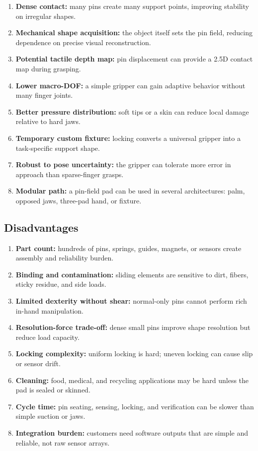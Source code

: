 \documentclass[11pt]{article}
\begin{document}
\begin{enumerate}[leftmargin=*]
  \item \textbf{Dense contact:} many pins create many support points, improving stability on irregular shapes.
  \item \textbf{Mechanical shape acquisition:} the object itself sets the pin field, reducing dependence on precise visual reconstruction.
  \item \textbf{Potential tactile depth map:} pin displacement can provide a 2.5D contact map during grasping.
  \item \textbf{Lower macro-DOF:} a simple gripper can gain adaptive behavior without many finger joints.
  \item \textbf{Better pressure distribution:} soft tips or a skin can reduce local damage relative to hard jaws.
  \item \textbf{Temporary custom fixture:} locking converts a universal gripper into a task-specific support shape.
  \item \textbf{Robust to pose uncertainty:} the gripper can tolerate more error in approach than sparse-finger grasps.
  \item \textbf{Modular path:} a pin-field pad can be used in several architectures: palm, opposed jaws, three-pad hand, or fixture.
\end{enumerate}

\subsection{Disadvantages}

\begin{enumerate}[leftmargin=*]
  \item \textbf{Part count:} hundreds of pins, springs, guides, magnets, or sensors create assembly and reliability burden.
  \item \textbf{Binding and contamination:} sliding elements are sensitive to dirt, fibers, sticky residue, and side loads.
  \item \textbf{Limited dexterity without shear:} normal-only pins cannot perform rich in-hand manipulation.
  \item \textbf{Resolution-force trade-off:} dense small pins improve shape resolution but reduce load capacity.
  \item \textbf{Locking complexity:} uniform locking is hard; uneven locking can cause slip or sensor drift.
  \item \textbf{Cleaning:} food, medical, and recycling applications may be hard unless the pad is sealed or skinned.
  \item \textbf{Cycle time:} pin seating, sensing, locking, and verification can be slower than simple suction or jaws.
  \item \textbf{Integration burden:} customers need software outputs that are simple and reliable, not raw sensor arrays.
\end{enumerate}
\end{document}
